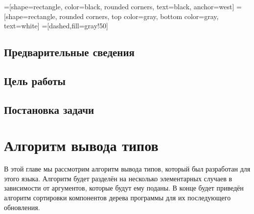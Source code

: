


    =[shape=rectangle, color=black, rounded corners,%
    text=black, anchor=west]
    =[shape=rectangle, rounded corners,%
    top color=gray,%
    bottom color=gray, text=white]
    =[dashed,fill=gray!50]



\Intro
\section*{Предварительные сведения}
\section*{Цель работы}
\section*{Постановка задачи}


\chapter{Алгоритм вывода типов}\label{type_inf}
В этой главе мы рассмотрим алгоритм вывода типов, который был разработан для этого языка. Алгоритм будет разделён на несколько элементарных случаев в зависимости от аргументов, которые будут ему поданы. В конце будет приведён алгоритм сортировки компонентов дерева программы для их последующего обновления. 
